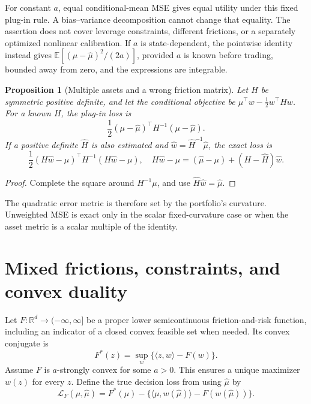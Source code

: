 \documentclass[11pt]{article}
\theoremstyle{plain}
\newtheorem{proposition}[theorem]{Proposition}
\theoremstyle{definition}
\theoremstyle{remark}
\newcommand{\E}{\mathbb E}
\newcommand{\R}{\mathbb R}
\begin{document}
For constant \(a\), equal conditional-mean MSE gives equal utility under
this fixed plug-in rule. A bias--variance decomposition cannot change
that equality. The assertion does not cover leverage constraints,
different frictions, or a separately optimized nonlinear calibration.
If \(a\) is state-dependent, the pointwise identity instead gives
\(\E[(\mu-\widehat\mu)^2/(2a)]\), provided \(a\) is known before trading,
bounded away from zero, and the expressions are integrable.

\begin{proposition}[Multiple assets and a wrong friction matrix]\label{prop:matrix}
Let \(H\) be symmetric positive definite, and let the conditional
objective be \(\mu^\top w-\frac12w^\top H w\).
For a known \(H\), the plug-in loss is
\[
\frac12(\mu-\widehat\mu)^\top H^{-1}(\mu-\widehat\mu).
\]
If a positive definite \(\widehat H\) is also estimated and
\(\widehat w=\widehat H^{-1}\widehat\mu\), the exact loss is
\begin{equation}\label{eq:frictionerror}
\frac12(H\widehat w-\mu)^\top H^{-1}(H\widehat w-\mu),
\quad
H\widehat w-\mu=(\widehat\mu-\mu)+(H-\widehat H)\widehat w.
\end{equation}
\end{proposition}
\begin{proof}
Complete the square around \(H^{-1}\mu\), and use
\(\widehat H\widehat w=\widehat\mu\).
\end{proof}

The quadratic error metric is therefore set by the portfolio's curvature.
Unweighted MSE is exact only in the scalar fixed-curvature case or when
the asset metric is a scalar multiple of the identity.

\section{Mixed frictions, constraints, and convex duality}

Let \(F:\R^d\to(-\infty,\infty]\) be a proper lower semicontinuous
friction-and-risk function, including an indicator of a closed convex
feasible set when needed. Its convex conjugate is
\[
F^\ast(z)=\sup_w\{\langle z,w\rangle-F(w)\}.
\]
Assume \(F\) is \(a\)-strongly convex for some \(a>0\).
This ensures a unique maximizer \(w(z)\) for every \(z\).
Define the true decision loss from using \(\widehat\mu\) by
\[
\mathcal L_F(\mu,\widehat\mu)=
F^\ast(\mu)-\{\langle\mu,w(\widehat\mu)\rangle-F(w(\widehat\mu))\}.
\]
\end{document}
